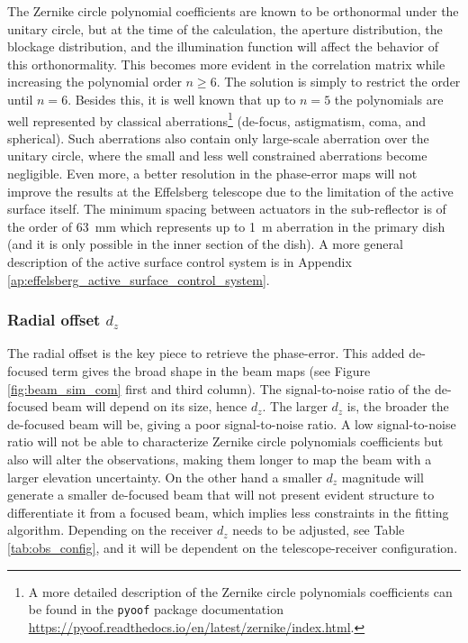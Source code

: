 \documentclass[
    ]
    {aa}
\begin{document}
    The Zernike circle polynomial coefficients are known to be orthonormal under the unitary circle, but at the time of the calculation, the aperture distribution, the blockage distribution, and the illumination function will affect the behavior of this orthonormality. This becomes more evident in the correlation matrix while increasing the polynomial order $n\geq6$.
    The solution is simply to restrict the order until $n=6$. Besides this, it is well known that up to $n=5$ the polynomials are well represented by classical aberrations\footnote{A more detailed description of the Zernike circle polynomials coefficients can be found in the \texttt{pyoof} package documentation \url{https://pyoof.readthedocs.io/en/latest/zernike/index.html}.} (de-focus, astigmatism, coma, and spherical). Such aberrations also contain only large-scale aberration over the unitary circle, where the small and less well constrained aberrations become negligible. Even more, a better resolution in the phase-error maps will not improve the results at the Effelsberg telescope due to the limitation of the active surface itself. The minimum spacing between actuators in the sub-reflector is of the order of \SI{63}{\mm} which represents up to \SI{1}{\m} aberration in the primary dish (and it is only possible in the inner section of the dish). A more general description of the active surface control system is in Appendix \ref{ap:effelsberg_active_surface_control_system}.

    \subsubsection{Radial offset $d_z$}
    The radial offset is the key piece to retrieve the phase-error. This added de-focused term gives the broad shape in the beam maps (see Figure \ref{fig:beam_sim_com} first and third column). The signal-to-noise ratio of the de-focused beam will depend on its size, hence $d_z$. The larger $d_z$ is, the broader the de-focused beam will be, giving a poor signal-to-noise ratio. A low signal-to-noise ratio will not be able to characterize Zernike circle polynomials coefficients but also will alter the observations, making them longer to map the beam with a larger elevation uncertainty. On the other hand a smaller $d_z$ magnitude will generate a smaller de-focused beam that will not present evident structure to differentiate it from a focused beam, which implies less constraints in the fitting algorithm. Depending on the receiver $d_z$ needs to be adjusted, see Table \ref{tab:obs_config}, and it will be dependent on the telescope-receiver configuration.
\end{document}

